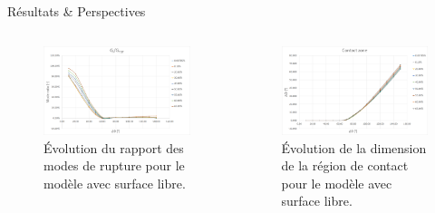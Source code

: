 \documentclass[final]{beamer}
\begin{document}
\begin{frame}
\begin{center}
\begin{minipage}{\textwidth}
\begin{alertblock}{\rule[-0.6ex]{0pt}{50pt}\centering\LARGE R\'esultats \& Perspectives}
\begin{columns}
\begin{column}{0.4\textwidth}
\begin{center}
\captionsetup[subfigure]{labelformat=empty}
\begin{figure}[!h]
\centering
 \includegraphics[width=0.9\columnwidth]{moderatio.png}
 \caption{\'Evolution du rapport des modes de rupture pour le mod\`ele avec surface libre.}
\end{figure}
     \end{center}
\end{column}
\begin{column}{0.4\textwidth}  %
    \begin{center}
\begin{figure}[!h]
\centering
     \includegraphics[width=0.9\columnwidth]{contactzone.png}
 \caption{\'Evolution de la dimension de la r\'egion de contact pour le mod\`ele avec surface libre.}
\end{figure}
     \end{center}
\end{column}
\end{columns}
\end{alertblock}
\end{minipage}
\end{center}


\end{frame}
\end{document}
